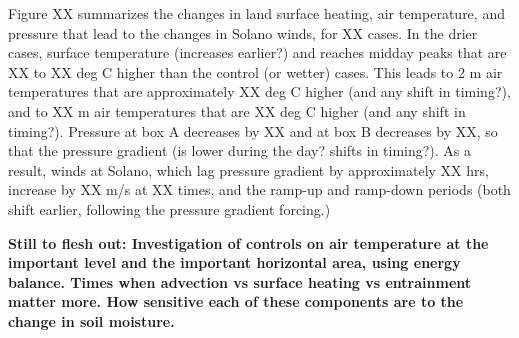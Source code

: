\documentclass[12pt]{amsart}
\begin{document}
Figure XX summarizes the changes in land surface heating, air temperature, and pressure that lead to the changes in Solano winds, for XX cases.  In the drier cases, surface temperature (increases earlier?) and reaches midday peaks that are XX to XX deg C higher than the control (or wetter) cases.  This leads to 2 m air temperatures that are approximately XX deg C higher (and any shift in timing?), and to XX m air temperatures that are XX deg C higher (and any shift in timing?).  Pressure at box A decreases by XX and at box B decreases by XX, so that the pressure gradient (is lower during the day?  shifts in timing?).  As a result, winds at Solano, which lag pressure gradient by approximately XX hrs, increase by XX m/s at XX times, and the ramp-up and ramp-down periods (both shift earlier, following the pressure gradient forcing.)

\textbf{Still to flesh out: Investigation of controls on air temperature at the important level and the important horizontal area, using energy balance.  Times when advection vs surface heating vs entrainment matter more.  How sensitive each of these components are to the change in soil moisture.}
\end{document}
